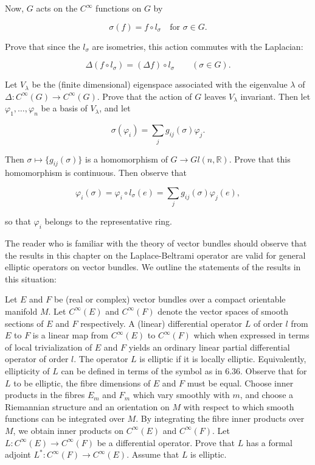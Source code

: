 \begin{problemset}
Now, $G$ acts on the $C^{\infty}$ functions on $G$ by 

\[
\sigma(f)=f\circ l_{\sigma}\quad\text{for }\sigma\in G.
\]

Prove that since the $l_{\sigma}$ are isometries, this action commutes with the Laplacian:

\[
\Delta(f\circ l_{\sigma})=(\Delta f)\circ l_{\sigma}\qquad(\sigma\in G).
\]

Let $V_\lambda$ be the (finite dimensional) eigenspace associated with the eigenvalue $\lambda$ of $\Delta\colon C^\infty(G) \to C^\infty(G)$. Prove that the action of $G$ leaves $V_\lambda$ invariant. Then let $\varphi_1, \ldots, \varphi_n$ be a basis of $V_\lambda$, and let

\[
\sigma(\varphi_{i})=\sum_{j}g_{i j}(\sigma)\varphi_{j}.
\]

Then $\sigma \mapsto \{g_{ij}(\sigma)\}$ is a homomorphism of $G \to Gl(n, \mathbb{R})$. Prove that this homomorphism is continuous. Then observe that

\[
\varphi_{i}(\sigma)=\varphi_{i}\circ l_{\sigma}(e)=\sum_{j}g_{i j}(\sigma)\varphi_{j}(e),
\]

so that  $ \varphi_{i} $ belongs to the representative ring.

\item The reader who is familiar with the theory of vector bundles should observe that the results in this chapter on the Laplace-Beltrami operator are valid for general elliptic operators on vector bundles. We outline the statements of the results in this situation:

Let $E$ and $F$ be (real or complex) vector bundles over a compact orientable manifold $M$. Let $C^\infty(E)$ and $C^\infty(F)$ denote the vector spaces of smooth sections of $E$ and $F$ respectively. A (linear) differential operator $L$ of order $l$ from $E$ to $F$ is a linear map from $C^\infty(E)$ to $C^\infty(F)$ which when expressed in terms of local trivialization of $E$ and $F$ yields an ordinary linear partial differential operator of order $l$. The operator $L$ is elliptic if it is locally elliptic. Equivalently, ellipticity of $L$ can be defined in terms of the symbol as in 6.36. Observe that for $L$ to be elliptic, the fibre dimensions of $E$ and $F$ must be equal. Choose inner products in the fibres $E_m$ and $F_m$ which vary smoothly with $m$, and choose a Riemannian structure and an orientation on $M$ with respect to which smooth functions can be integrated over $M$. By integrating the fibre inner products over $M$, we obtain inner products on $C^\infty(E)$ and $C^\infty(F)$. Let $L: C^\infty(E) \to C^\infty(F)$ be a differential operator. Prove that $L$ has a formal adjoint $L^*: C^\infty(F) \to C^\infty(E)$. Assume that $L$ is elliptic.


\end{problemset}
